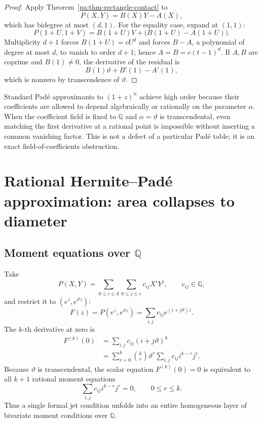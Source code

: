 \documentclass[11pt,oneside]{article}
\theoremstyle{definition}
\theoremstyle{remark}
\newcommand{\Q}{\mathbb Q}
\newcommand{\thetaq}{\vartheta}
\begin{document}
\begin{proof}
Apply Theorem~\ref{pa:thm-rectangle-contact} to
\[
 P(X,Y)=B(X)Y-A(X),
\]
which has bidegree at most \((d,1)\).  For the equality case, expand at \((1,1)\):
\[
 P(1+U,1+V)=B(1+U)V+\bigl(B(1+U)-A(1+U)\bigr).
\]
Multiplicity \(d+1\) forces \(B(1+U)=cU^d\) and forces \(B-A\), a polynomial of degree at
most \(d\), to vanish to order \(d+1\); hence \(A=B=c(t-1)^d\).  If \(A,B\) are coprime and
\(B(1)\ne0\), the derivative of the residual is
\[
 B(1)\thetaq+B'(1)-A'(1),
\]
which is nonzero by transcendence of \(\thetaq\).
\end{proof}

Standard Pad\'e approximants to \((1+z)^\alpha\) achieve high order because their coefficients
are allowed to depend algebraically or rationally on the parameter \(\alpha\).  When the
coefficient field is fixed to \(\Q\) and \(\alpha=\thetaq\) is transcendental, even matching
the first derivative at a rational point is impossible without inserting a common vanishing
factor.  This is not a defect of a particular Pad\'e table; it is an exact field-of-coefficients
obstruction.

\section{Rational Hermite--Pad\'e approximation: area collapses to diameter}
\label{pa:sec-area-diameter}

\subsection{Moment equations over \texorpdfstring{\(\Q\)}{Q}}

Take
\begin{equation}
 P(X,Y)=\sum_{0\le i\le d}\sum_{0\le j\le e}c_{ij}X^iY^j,
 \qquad c_{ij}\in\Q,
 \label{pa:eq-rectangle-P}
\end{equation}
and restrict it to \((e^z,e^{\thetaq z})\):
\begin{equation}
 F(z)=P(e^z,e^{\thetaq z})
 =\sum_{i,j}c_{ij}e^{(i+j\thetaq)z}.
 \label{pa:eq-HP-restriction}
\end{equation}
The \(k\)-th derivative at zero is
\begin{align}
 F^{(k)}(0)
 &=\sum_{i,j}c_{ij}(i+j\thetaq)^k\\
 &=\sum_{r=0}^{k}\binom{k}{r}\thetaq^r
   \sum_{i,j}c_{ij}i^{k-r}j^r.
 \label{pa:eq-moment-unfolding}
\end{align}
Because \(\thetaq\) is transcendental, the scalar equation \(F^{(k)}(0)=0\) is equivalent to
all \(k+1\) rational moment equations
\begin{equation}
 \sum_{i,j}c_{ij}i^{k-r}j^r=0,
 \qquad 0\le r\le k.
 \label{pa:eq-rational-moments}
\end{equation}
Thus a single formal jet condition unfolds into an entire homogeneous layer of bivariate
moment conditions over \(\Q\).
\end{document}

